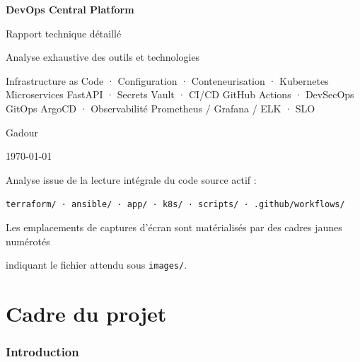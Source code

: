 \documentclass[12pt,a4paper]{article}
\begin{document}
\begin{titlepage}
  \centering
  \vspace*{1.6cm}
  {\Huge\bfseries DevOps Central Platform\par}
  \vspace{0.6cm}
  {\LARGE Rapport technique détaillé\par}
  \vspace{0.4cm}
  {\Large Analyse exhaustive des outils et technologies\par}
  \vspace{1cm}
  {\large Infrastructure as Code · Configuration · Conteneurisation · Kubernetes\\
  Microservices FastAPI · Secrets Vault · CI/CD GitHub Actions · DevSecOps\\
  GitOps ArgoCD · Observabilité Prometheus / Grafana / ELK · SLO\par}
  \vfill
  {\large Gadour\par}
  \vspace{0.4cm}
  {\large \today\par}
  \vfill
  {\footnotesize Analyse issue de la lecture intégrale du code source actif :\par
  \texttt{terraform/ · ansible/ · app/ · k8s/ · scripts/ · .github/workflows/}\par
  \vspace{4mm}
  Les emplacements de captures d'écran sont matérialisés par des cadres jaunes numérotés\par
  indiquant le fichier attendu sous \texttt{images/}.\par}
\end{titlepage}

\tableofcontents
\clearpage

\part{Cadre du projet}

\section{Introduction}
\end{document}
